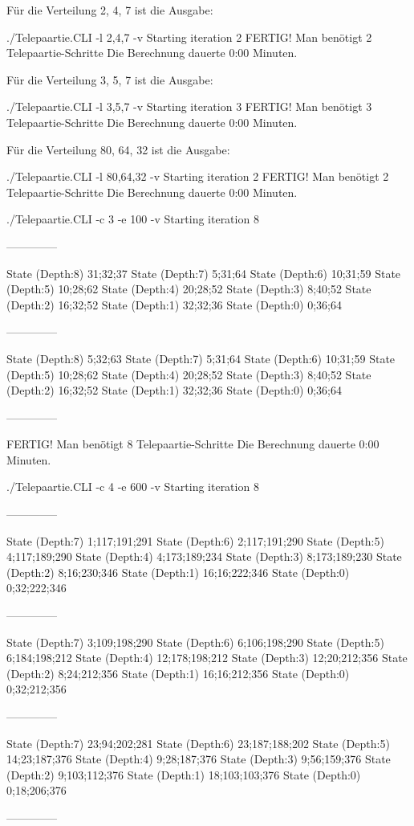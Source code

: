 \documentclass[a4paper,10pt,ngerman]{scrartcl}
\begin{document}
Für die Verteilung 2, 4, 7 ist die Ausgabe:
\begin{lstcs}
./Telepaartie.CLI -l 2,4,7 -v
Starting iteration 2
FERTIG!
Man benötigt 2 Telepaartie-Schritte
Die Berechnung dauerte 0:00 Minuten.
\end{lstcs}
Für die Verteilung 3, 5, 7 ist die Ausgabe:
\begin{lstcs}
./Telepaartie.CLI -l 3,5,7 -v
Starting iteration 3
FERTIG!
Man benötigt 3 Telepaartie-Schritte
Die Berechnung dauerte 0:00 Minuten.
\end{lstcs}
Für die Verteilung 80, 64, 32 ist die Ausgabe:
\begin{lstcs}
./Telepaartie.CLI -l 80,64,32 -v
Starting iteration 2
FERTIG!
Man benötigt 2 Telepaartie-Schritte
Die Berechnung dauerte 0:00 Minuten.
\end{lstcs}
\begin{lstcs}
./Telepaartie.CLI -c 3 -e 100 -v
Starting iteration 8

--------------

State (Depth:8) {31;32;37}
State (Depth:7) {5;31;64}
State (Depth:6) {10;31;59}
State (Depth:5) {10;28;62}
State (Depth:4) {20;28;52}
State (Depth:3) {8;40;52}
State (Depth:2) {16;32;52}
State (Depth:1) {32;32;36}
State (Depth:0) {0;36;64}

--------------

State (Depth:8) {5;32;63}
State (Depth:7) {5;31;64}
State (Depth:6) {10;31;59}
State (Depth:5) {10;28;62}
State (Depth:4) {20;28;52}
State (Depth:3) {8;40;52}
State (Depth:2) {16;32;52}
State (Depth:1) {32;32;36}
State (Depth:0) {0;36;64}

--------------


FERTIG!
Man benötigt 8 Telepaartie-Schritte
Die Berechnung dauerte 0:00 Minuten.
\end{lstcs}
\begin{lstcs}
./Telepaartie.CLI -c 4 -e 600 -v
Starting iteration 8

--------------

State (Depth:7) {1;117;191;291}
State (Depth:6) {2;117;191;290}
State (Depth:5) {4;117;189;290}
State (Depth:4) {4;173;189;234}
State (Depth:3) {8;173;189;230}
State (Depth:2) {8;16;230;346}
State (Depth:1) {16;16;222;346}
State (Depth:0) {0;32;222;346}

--------------

State (Depth:7) {3;109;198;290}
State (Depth:6) {6;106;198;290}
State (Depth:5) {6;184;198;212}
State (Depth:4) {12;178;198;212}
State (Depth:3) {12;20;212;356}
State (Depth:2) {8;24;212;356}
State (Depth:1) {16;16;212;356}
State (Depth:0) {0;32;212;356}

--------------

State (Depth:7) {23;94;202;281}
State (Depth:6) {23;187;188;202}
State (Depth:5) {14;23;187;376}
State (Depth:4) {9;28;187;376}
State (Depth:3) {9;56;159;376}
State (Depth:2) {9;103;112;376}
State (Depth:1) {18;103;103;376}
State (Depth:0) {0;18;206;376}

--------------
\end{lstcs}
\end{document}
